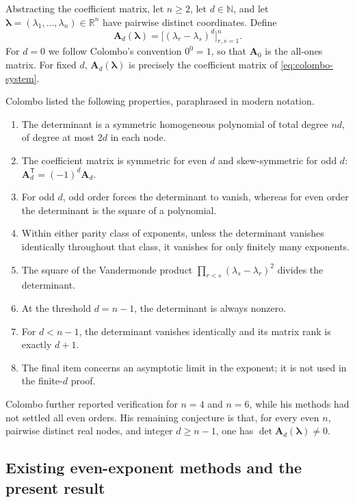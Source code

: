 \documentclass[11pt,letterpaper,reqno]{amsart}
\numberwithin{equation}{section}
\theoremstyle{definition}
\newcommand{\RR}{\mathbb{R}}
\newcommand{\Mat}[1]{\mathbf{#1}}
\newcommand{\vct}[1]{\boldsymbol{#1}}
\begin{document}
Abstracting the coefficient matrix, let \(n\ge2\), let
\(d\in\mathbb N\), and let
\(\vct{\lambda}=(\lambda_1,\ldots,\lambda_n)\in\RR^n\) have pairwise
distinct coordinates.  Define
\begin{equation}\label{eq:Ad-definition}
 \Mat{A}_d(\vct{\lambda})
 =\bigl[(\lambda_r-\lambda_s)^d\bigr]_{r,s=1}^n.
\end{equation}
For \(d=0\) we follow Colombo's convention \(0^0=1\), so that
\(\Mat{A}_0\) is the all-ones matrix.  For fixed \(d\),
\(\Mat{A}_d(\vct{\lambda})\) is precisely the coefficient matrix of
\eqref{eq:colombo-system}.

Colombo \cite[pp.~35--36, properties I--VIII]{Colombo1928} listed the
following properties, paraphrased in modern notation.
\begin{enumerate}[label=\textup{\Roman*.}]
\item The determinant is a symmetric homogeneous polynomial of total
degree \(nd\), of degree at most \(2d\) in each node.
\item The coefficient matrix is symmetric for even \(d\) and
skew-symmetric for odd \(d\):
\(\Mat{A}_d^{\mathsf T}=(-1)^d\Mat{A}_d\).
\item For odd \(d\), odd order forces the determinant to vanish, whereas
for even order the determinant is the square of a polynomial.
\item Within either parity class of exponents, unless the determinant
vanishes identically throughout that class, it vanishes for only finitely
many exponents.
\item The square of the Vandermonde product
\(\prod_{r<s}(\lambda_s-\lambda_r)^2\) divides the determinant.
\item At the threshold \(d=n-1\), the determinant is always nonzero.
\item For \(d<n-1\), the determinant vanishes identically and its matrix
rank is exactly \(d+1\).
\item The final item concerns an asymptotic limit in the exponent; it is
not used in the finite-\(d\) proof.
\end{enumerate}
Colombo \cite[p.~36]{Colombo1928} further reported verification for
\(n=4\) and \(n=6\), while his methods had not settled all even orders.
His remaining conjecture is that, for every even \(n\), pairwise distinct
real nodes, and integer \(d\ge n-1\), one has
\(\det\Mat{A}_d(\vct{\lambda})\ne0\).

\subsection{Existing even-exponent methods and the present result}
\end{document}
